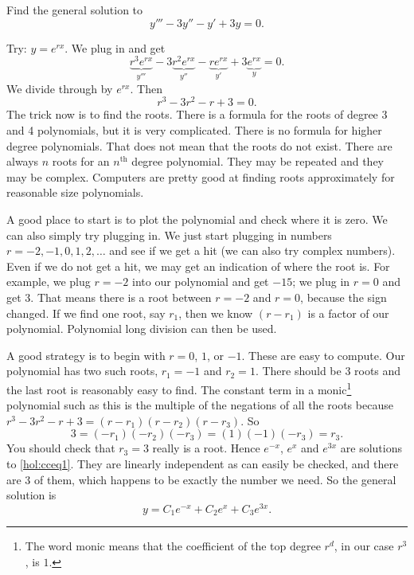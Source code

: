 \begin{example}
Find the general solution to
\begin{equation} \label{hol:cceq1}
y''' - 3 y'' - y' + 3y = 0 .
\end{equation}

Try: $y = e^{rx}$.  We plug in and get
\begin{equation*}
\underbrace{r^3 e^{rx}}_{y'''} - 3 \underbrace{r^2 e^{rx}}_{y''} -
\underbrace{r e^{rx}}_{y'} + 3 \underbrace{e^{rx}}_{y} = 0 .
\end{equation*}
We divide through by $e^{rx}$.  Then 
\begin{equation*}
r^3 - 3 r^2 - r + 3 = 0 .
\end{equation*}
The trick now is to find the roots.  There is a formula for the roots of
degree 3 and 4 polynomials, but it is very complicated.  There is no formula
for higher degree polynomials.  That does not mean that the roots do not
exist.  There are always
$n$ roots for an $n^{\text{th}}$ degree polynomial.  They may be
repeated
and they may be complex.  Computers are pretty good at finding roots
approximately for reasonable size polynomials.

A good place to start is to plot the polynomial and check where it is zero.
We can also simply try plugging in.  We
just start plugging
in numbers $r=-2,-1,0,1,2,\ldots$ and see if we get a hit (we can also
try complex numbers).  Even
if we do not get a hit, we may get an indication
of where the root is.  For example, we plug
$r=-2$ into our polynomial and get $-15$; we plug in $r=0$ and get $3$.
That means there is a root between $r=-2$ and $r=0$,
because the sign changed.
If we find one root, say $r_1$, then we know $(r-r_1)$ is a factor
of our polynomial.  Polynomial long division can then be used.

A good strategy is to begin with $r=0$, $1$, or $-1$.  These are
easy to compute.  Our polynomial has
two such roots, $r_1 = -1$
and $r_2 = 1$.  There should be 3 roots and the last root is reasonably
easy to find.  The constant
term in a monic\footnote{The word monic means that the coefficient of the
top degree $r^d$, in our case $r^3$, is $1$.}
polynomial such as this is the multiple of the negations of all the roots
because $r^3 - 3 r^2 - r + 3 = (r-r_1)(r-r_2)(r-r_3)$.
So
\begin{equation*}
3 = (-r_1)(-r_2)(-r_3) = (1)(-1)(-r_3) = r_3 .
\end{equation*}
You should check that $r_3 = 3$ really
is a root.  Hence $e^{-x}$, $e^{x}$
and $e^{3x}$ are solutions to \eqref{hol:cceq1}.  They are linearly independent
as can easily be checked, and there are 3 of them, which happens to be exactly
the number we need.  So the general solution is
\begin{equation*}
y = C_1 e^{-x} + C_2 e^{x} + C_3 e^{3x} .
\end{equation*}


\end{example}
